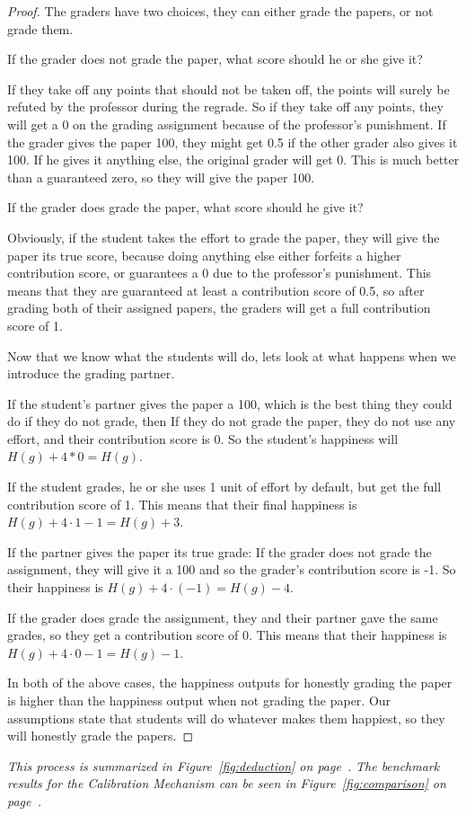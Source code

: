 \documentclass[12pt, Arial]{article}
\begin{document}
\begin{proof}
The graders have two choices, they can either grade the papers, or not grade them.

If the grader does not grade the paper, what score should he or she give it?

If they take off any points that should not be taken off, the points will surely be refuted by the professor during the regrade.
So if they take off any points, they will get a 0 on the grading assignment because of the professor's punishment.
If the grader gives the paper 100, they might get 0.5 if the other grader also gives it 100. If he gives it anything else, the original grader will get 0. This is much better than a guaranteed zero, so they will give the paper 100.

If the grader does grade the paper, what score should he give it?

Obviously, if the student takes the effort to grade the paper, they will give the paper its true score, because doing anything else either forfeits a higher contribution score, or guarantees a 0 due to the professor's punishment. This means that they are guaranteed at least a contribution score of 0.5, so after grading both of their assigned papers, the graders will get a full contribution score of 1.

Now that we know what the students will do, lets look at what happens when we introduce the grading partner. 

If the student's partner gives the paper a 100, which is the best thing they could do if they do not grade, then
	If they do not grade the paper, they do not use any effort, and their contribution score is 0. So the student's happiness will $H(g) + 4*0 = H(g)$.

If the student grades, he or she uses 1 unit of effort by default, but get the full contribution score of 1. This means that their final happiness is $H(g) + 4\cdot1 - 1 = H(g)+3$.
	
If the partner gives the paper its true grade:
	If the grader does not grade the assignment, they will give it a 100 and so the grader's contribution score is -1. So their happiness is $H(g) + 4\cdot(-1) = H(g)-4$.

If the grader does grade the assignment, they and their partner gave the same grades, so they get a contribution score of 0. This means that their happiness is $H(g) + 4\cdot0 - 1 = H(g)-1$.
	
In both of the above cases, the happiness outputs for honestly grading the paper is higher than the happiness output when not grading the paper. Our assumptions state that students will do whatever makes them happiest, so they will honestly grade the papers.

\end{proof}
\noindent
\emph{This process is summarized in Figure~\ref{fig:deduction} on page~\pageref{fig:deduction}.}
\newline
\emph{The benchmark results for the Calibration Mechanism can be seen in Figure~\ref{fig:comparison} on page~\pageref{fig:comparison}.}
\end{document}
